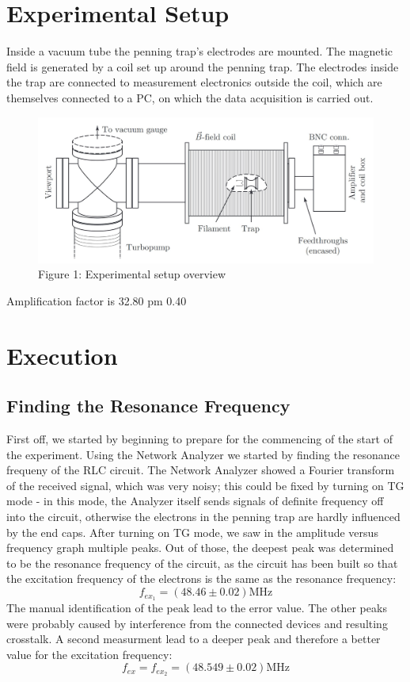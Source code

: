\documentclass[12pt]{article}
\begin{document}
\section{Experimental Setup}
Inside a vacuum tube the penning trap's electrodes are mounted. The magnetic field is generated by a coil set up around the penning trap. The electrodes inside the trap are connected to measurement electronics outside the coil, which are themselves connected to a PC, on which the data acquisition is carried out.

\begin{figure}[h]
	\centering
	\includegraphics[width=16cm,bbllx=112,bburx=447,bblly=264,bbury=582]{versuchsaufbau.JPG}
	\caption{Figure 1: Experimental setup overview}
	\label{ps}
\end{figure}

Amplification factor is 32.80 pm 0.40


\section{Execution}

\subsection{Finding the Resonance Frequency}
First off, we started by beginning to prepare for the commencing of the start of the experiment.
Using the Network Analyzer we started by finding the resonance frequeny of the RLC circuit. The Network Analyzer showed a Fourier transform of the received signal, which was very noisy; this could be fixed by turning on TG mode - in this mode, the Analyzer itself sends signals of definite frequency off into the circuit,
otherwise the electrons in the penning trap are hardly influenced by the end caps. After turning on TG mode, we saw in the amplitude versus frequency graph multiple peaks. Out of those, the deepest peak was determined to be the resonance frequency of the circuit, as the circuit has been built so that the excitation frequency of the electrons is the same as the resonance frequency:
\begin{equation*} f_{ex_1} = (48.46 \pm 0.02) \text{MHz} \end{equation*}
The manual identification of the peak lead to the error value. The other peaks were probably caused by interference from the connected devices and resulting crosstalk.
A second measurment lead to a deeper peak and therefore a better value for the excitation frequency:
\begin{equation*} f_{ex} =  f_{ex_2} = (48.549 \pm 0.02) \text{MHz} \end{equation*}
\end{document}

